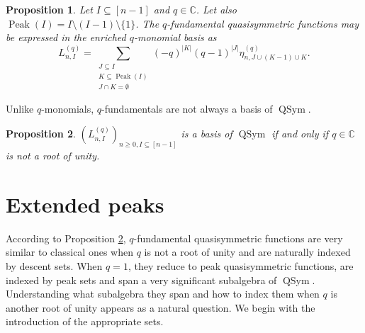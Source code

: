 \documentclass[submission]{FPSAC2023}
\newtheorem{proposition}{Proposition}
\newcommand{\CC}{\mathbb{C}} %
\newcommand{\QSym}{\operatorname{QSym}}
\newcommand{\Peak}{\operatorname{Peak}}
\begin{document}
\begin{proposition} Let $I \subseteq[n-1]$ and $q \in \CC$. Let also $\Peak(I) = I\setminus (I-1)\setminus \{1\}$. The $q$-fundamental quasisymmetric functions may be expressed in the enriched $q$-monomial basis as
\begin{equation}
\label{eq : LEq}
L_{n, I}^{(q)}
= \sum_{\substack{J \subseteq I\\K \subseteq \Peak(I)\\J \cap K = \emptyset}}
(-q)^{|K|}(q-1)^{|J|}\eta^{(q)}_{n, J\cup (K-1) \cup K}.
\end{equation}
\end{proposition}
Unlike $q$-monomials, $q$-fundamentals are not always a basis of $\QSym$.
\begin{proposition}\label{thm : basis} $(L_{n, I}^{(q)})_{n\geq0, I\subseteq[n-1]}$ is a basis of $\QSym$ if and only if $q \in \CC$ is not a root of unity.
\end{proposition}
\section{Extended peaks}
According to Proposition \ref{thm : basis}, $q$-fundamental quasisymmetric functions are very similar to classical ones when $q$ is not a root of unity and are naturally indexed by descent sets. When $q=1$, they reduce to peak quasisymmetric functions, are indexed by peak sets and span a very significant subalgebra of $\QSym$. Understanding what subalgebra they span and how to index them when $q$ is another root of unity appears as a natural question. We begin with the introduction of the appropriate sets. 
\end{document}
